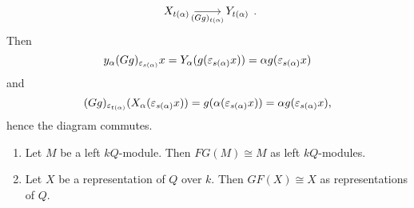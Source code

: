 \begin{rem}
\begin{enumerate}
\begin{itemize}
\[\begin{tikzcd}
      X_{t(\alpha)}\ar[swap]{r}{(Gg)_{t(\alpha)}}&Y_{t(\alpha)}
      \end{tikzcd}.
      \]
      Then
      \[
      y_{\alpha}(Gg)_{\varepsilon_{s(\alpha)}}x=Y_{\alpha}(g(\varepsilon_{s(\alpha)}x))=\alpha g(\varepsilon_{s(\alpha)}x)\]
      and
      \[
      (Gg)_{\varepsilon_{t(\alpha)}}(X_{\alpha}(\varepsilon_{s(\alpha)}x)) = g(\alpha(\varepsilon_{s(\alpha)}x)) = \alpha g(\varepsilon_{s(\alpha)}x),
      \]
      hence the diagram commutes.
    \end{itemize}
  \end{enumerate}
\end{rem}

\begin{thm}
  \begin{enumerate}
    \item Let $M$ be a left $kQ$-module. Then $FG(M)\cong M$ as left $kQ$-modules.
    \item Let $X$ be a representation of $Q$ over $k$. Then $GF(X)\cong X$ as representations of $Q$.
  \end{enumerate}
\end{thm}

